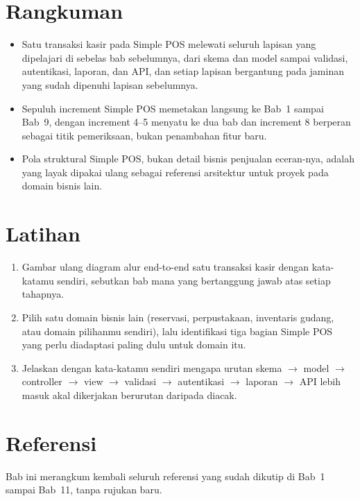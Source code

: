 \section{Rangkuman}
\label{sec:studi-kasus-menyeluruh-rangkuman}

\begin{itemize}
  \item Satu transaksi kasir pada Simple POS melewati seluruh lapisan
    yang dipelajari di sebelas bab sebelumnya, dari skema dan model
    sampai validasi, autentikasi, laporan, dan API, dan setiap lapisan
    bergantung pada jaminan yang sudah dipenuhi lapisan sebelumnya.
  \item Sepuluh increment Simple POS memetakan langsung ke Bab~1 sampai
    Bab~9, dengan increment 4--5 menyatu ke dua bab dan increment 8
    berperan sebagai titik pemeriksaan, bukan penambahan fitur baru.
  \item Pola struktural Simple POS, bukan detail bisnis penjualan
    eceran-nya, adalah yang layak dipakai ulang sebagai referensi
    arsitektur untuk proyek pada domain bisnis lain.
\end{itemize}

\section{Latihan}

\begin{enumerate}
  \item Gambar ulang diagram alur end-to-end satu transaksi kasir
    dengan kata-katamu sendiri, sebutkan bab mana yang bertanggung
    jawab atas setiap tahapnya.
  \item Pilih satu domain bisnis lain (reservasi, perpustakaan,
    inventaris gudang, atau domain pilihanmu sendiri), lalu identifikasi
    tiga bagian Simple POS yang perlu diadaptasi paling dulu untuk
    domain itu.
  \item Jelaskan dengan kata-katamu sendiri mengapa urutan skema
    $\to$ model $\to$ controller $\to$ view $\to$ validasi $\to$
    autentikasi $\to$ laporan $\to$ API lebih masuk akal dikerjakan
    berurutan daripada diacak.
\end{enumerate}

\section{Referensi}

Bab ini merangkum kembali seluruh referensi yang sudah dikutip di
Bab~1 sampai Bab~11, tanpa rujukan baru.
